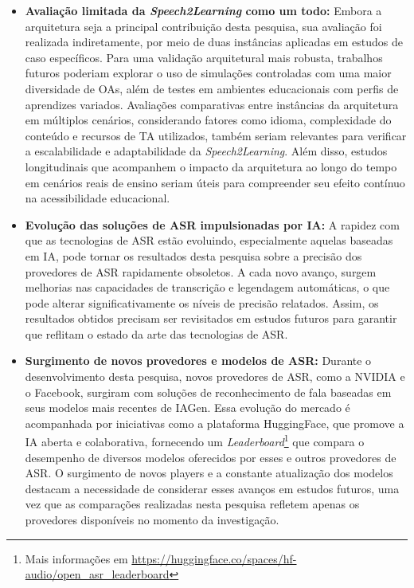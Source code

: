 \begin{itemize}

\item \textbf{Avaliação limitada da \textit{Speech2Learning} como um todo:} Embora a arquitetura seja a principal contribuição desta pesquisa, sua avaliação foi realizada indiretamente, por meio de duas instâncias aplicadas em estudos de caso específicos. Para uma validação arquitetural mais robusta,  trabalhos futuros poderiam explorar o uso de simulações controladas com uma maior diversidade de OAs, além de testes em ambientes educacionais com perfis de aprendizes variados. Avaliações comparativas entre instâncias da arquitetura em múltiplos cenários, considerando fatores como idioma, complexidade do conteúdo e recursos de TA utilizados, também seriam relevantes para verificar a escalabilidade e adaptabilidade da \textit{Speech2Learning}. Além disso, estudos longitudinais que acompanhem o impacto da arquitetura ao longo do tempo em cenários reais de ensino seriam úteis para compreender seu efeito contínuo na acessibilidade educacional.

\item \textbf{Evolução das soluções de ASR impulsionadas por IA:} A rapidez com que as tecnologias de ASR estão evoluindo, especialmente aquelas baseadas em IA, pode tornar os resultados desta pesquisa sobre a precisão dos provedores de ASR rapidamente obsoletos. A cada novo avanço, surgem melhorias nas capacidades de transcrição e legendagem automáticas, o que pode alterar significativamente os níveis de precisão relatados. Assim, os resultados obtidos precisam ser revisitados em estudos futuros para garantir que reflitam o estado da arte das tecnologias de ASR.

\item \textbf{Surgimento de novos provedores e modelos de ASR:} Durante o desenvolvimento desta pesquisa, novos provedores de ASR, como a NVIDIA e o Facebook, surgiram com soluções de reconhecimento de fala baseadas em seus modelos mais recentes de IAGen. Essa evolução do mercado é acompanhada por iniciativas como a plataforma HuggingFace, que promove a IA aberta e colaborativa, fornecendo um \textit{Leaderboard}\footnote{Mais informações em \url{https://huggingface.co/spaces/hf-audio/open_asr_leaderboard}} que compara o desempenho de diversos modelos oferecidos por esses e outros provedores de ASR. O surgimento de novos players e a constante atualização dos modelos destacam a necessidade de considerar esses avanços em estudos futuros, uma vez que as comparações realizadas nesta pesquisa refletem apenas os provedores disponíveis no momento da investigação.


\end{itemize}

